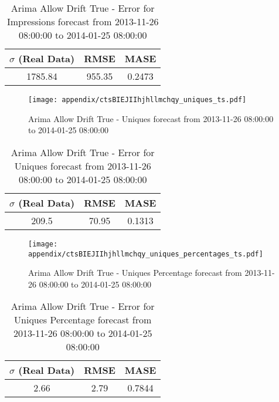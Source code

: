 \begin{table}[H]
\centering
\footnotesize
\begin{tabular}{ccc}
$\sigma$ (Real Data) & RMSE & MASE   \\ \hline
1785.84 & 955.35 & 0.2473 \\
\end{tabular}

\vspace{0.5cm}

\caption{
Arima Allow Drift True - Error for Impressions forecast from 2013-11-26 08:00:00 to 2014-01-25 08:00:00}
\end{table}

\begin{figure}[H] \begin{center} \leavevmode
\texttt{[image: appendix/ctsBIEJIIhjhllmchqy\_uniques\_ts.pdf]} \caption{
Arima Allow Drift True - Uniques forecast from 2013-11-26 08:00:00 to 2014-01-25 08:00:00} \label{fig:appendix/ctsBIEJIIhjhllmchqy_uniques_ts.pdf} \end{center}
\end{figure}

\begin{table}[H]
\centering
\footnotesize
\begin{tabular}{ccc}
$\sigma$ (Real Data) & RMSE & MASE   \\ \hline
209.5 & 70.95 & 0.1313 \\
\end{tabular}

\vspace{0.5cm}

\caption{
Arima Allow Drift True - Error for Uniques forecast from 2013-11-26 08:00:00 to 2014-01-25 08:00:00}
\end{table}

\begin{figure}[H] \begin{center} \leavevmode
\texttt{[image: appendix/ctsBIEJIIhjhllmchqy\_uniques\_percentages\_ts.pdf]} \caption{
Arima Allow Drift True - Uniques Percentage forecast from 2013-11-26 08:00:00 to 2014-01-25 08:00:00} \label{fig:appendix/ctsBIEJIIhjhllmchqy_uniques_percentages_ts.pdf} \end{center}
\end{figure}

\begin{table}[H]
\centering
\footnotesize
\begin{tabular}{ccc}
$\sigma$ (Real Data) & RMSE & MASE   \\ \hline
2.66 & 2.79 & 0.7844 \\
\end{tabular}

\vspace{0.5cm}

\caption{
Arima Allow Drift True - Error for Uniques Percentage forecast from 2013-11-26 08:00:00 to 2014-01-25 08:00:00}
\end{table}

